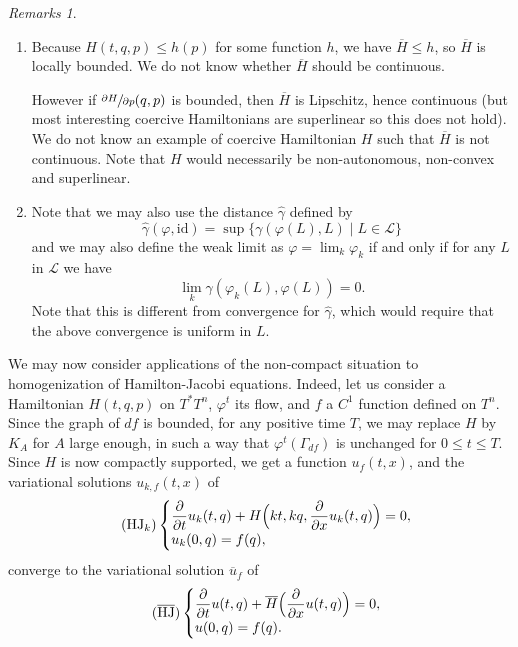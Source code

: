 \documentclass[JEP,XML,SOM,NoFloatCountersInSection,Unicode,published]{cedram}
\newcommand{\HJ}{\mathrm{HJ}}
\numberwithin{equation}{section}
\theoremstyle{plain}
\theoremstyle{definition}
\theoremstyle{remark}
\newtheorem{remarks}[theorem]{Remarks}
\begin{document}
\skpt
\begin{remarks}
\begin{enumerate}
\item Because $H(t,q,p)\leq h(p)$ for some function $h$, we have $\overline H \leq h$, so $\overline H$ is locally bounded. We do not know whether
$\overline H$ should be continuous.

However if $ \sfrac{\partial H}{\partial p}(q,p)$ is bounded, then $\overline H$ is Lipschitz, hence continuous (but most interesting coercive Hamiltonians are superlinear so this does not hold). We do not know an example of coercive Hamiltonian $H$ such that $\overline H$ is not continuous. Note that $H$ would necessarily be non-autonomous, non-convex and superlinear.
\item
Note that we may also use the distance $\widehat\gamma$ defined by
\[
\widehat\gamma (\varphi, \mathrm{id})= \sup\{ \gamma (\varphi (L),L) \mid L\in {\mathcal L} \}
\]
and we may also define the weak limit as $\varphi=\lim_k \varphi_k$ if and only if for any $L$ in $\mathcal L$ we have
\[
\lim_k \gamma (\varphi_k(L), \varphi (L))=0.
\]
Note that this is different from convergence for $\widehat \gamma$, which would require that the above convergence is uniform in $L$. \end{enumerate}
\end{remarks}

We may now consider applications of the non-compact situation to homogenization of Hamilton-Jacobi equations.
Indeed, let us consider a Hamiltonian $H(t,q,p)$ on $T^*T^n$, $\varphi^t$ its flow, and $f$ a $C^1$ function defined on $T^n$. Since the graph of $df$ is bounded, for any positive time $T$, we may replace $H$ by $K_{A}$ for $A$ large enough, in such a way that $\varphi^t (\Gamma_{df})$ is unchanged for $0\leq t \leq T$. Since $H$ is now compactly supported, we get
a function $u_f(t,x)$, and the variational solutions $u_{k,f}(t,x)$ of
\[
\tag{$\HJ_{k}$}
\begin{cases}
\dfrac{\partial}{\partial t} u_{k} (t,q) + H \Bigl(kt, kq,
\dfrac{\partial}{\partial x} u_{k}(t,q)\Bigr) = 0,\\
u_{k} (0,q) = f(q),
\end{cases}
\]
converge to the variational solution ${\overline u}_f$ of
\[
\tag{$\overline{\HJ}$}
\begin{cases}
\dfrac{\partial}{\partial t} u(t,q) + {\overline H} \Bigl(\dfrac{\partial}{\partial x} u(t,q)\Bigr) = 0,\\
u (0,q) = f(q).
\end{cases}
\]
\end{document}
